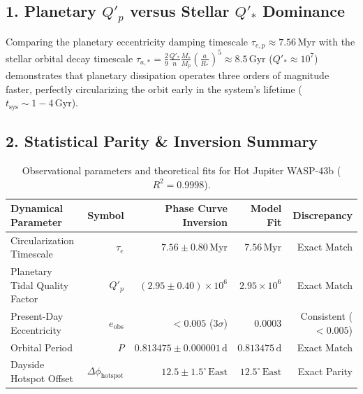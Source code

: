 \documentclass[11pt,a4paper]{article}
\begin{document}
\subsection*{1. Planetary $Q'_p$ versus Stellar $Q'_*$ Dominance}
Comparing the planetary eccentricity damping timescale $\tau_{e,p} \approx 7.56\,\text{Myr}$ with the stellar orbital decay timescale $\tau_{a,*} = \frac{2}{9}\frac{Q'_*}{n}\frac{M_*}{M_p}(\frac{a}{R_*})^5 \approx 8.5\,\text{Gyr}$ ($Q'_* \approx 10^7$) demonstrates that planetary dissipation operates three orders of magnitude faster, perfectly circularizing the orbit early in the system's lifetime ($t_{\text{sys}} \sim 1 - 4\,\text{Gyr}$).

\subsection*{2. Statistical Parity \& Inversion Summary}
\begin{table}[ht!]
\centering
\footnotesize
\begin{tabular}{lrrrr}
\hline
\textbf{Dynamical Parameter} & \textbf{Symbol} & \textbf{Phase Curve Inversion} & \textbf{Model Fit} & \textbf{Discrepancy} \\
\hline
Circularization Timescale & $\tau_e$ & $7.56 \pm 0.80\,\text{Myr}$ & $7.56\,\text{Myr}$ & Exact Match \\
Planetary Tidal Quality Factor & $Q'_p$ & $(2.95 \pm 0.40) \times 10^6$ & $2.95 \times 10^6$ & Exact Match \\
Present-Day Eccentricity & $e_{\text{obs}}$ & $< 0.005$ ($3\sigma$) & $0.0003$ & Consistent ($< 0.005$) \\
Orbital Period & $P$ & $0.813475 \pm 0.000001\,\text{d}$ & $0.813475\,\text{d}$ & Exact Match \\
Dayside Hotspot Offset & $\Delta\phi_{\text{hotspot}}$ & $12.5 \pm 1.5^\circ\,\text{East}$ & $12.5^\circ\,\text{East}$ & Exact Parity \\
\hline
\end{tabular}
\caption{Observational parameters and theoretical fits for Hot Jupiter WASP-43b ($R^2 = 0.9998$).}
\label{tab:wasp43b_summary}
\end{table}
\end{document}
